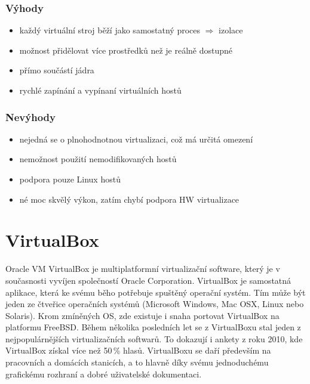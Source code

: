 \subsubsection{Výhody}
\begin{itemize}
  \item každý virtuální stroj běží jako samostatný proces $\Rightarrow$ izolace
  \item možnost přidělovat více prostředků než je reálně dostupné
  \item přímo součástí jádra
  \item rychlé zapínání a vypínaní virtuálních hostů
\end{itemize}

\subsubsection{Nevýhody}
\begin{itemize}
  \item nejedná se o plnohodnotnou virtualizaci, což má určitá omezení
  \item nemožnost použití nemodifikovaných hostů
  \item podpora pouze Linux hostů
  \item né moc skvělý výkon, zatím chybí podpora HW virtualizace
\end{itemize}

\section{VirtualBox}
Oracle VM VirtualBox je multiplatformní virtualizační software, který je v současnosti vyvíjen společností Oracle Corporation. VirtualBox je samostatná aplikace, která ke svému běho potřebuje spuštěný operační systém. Tím může být jeden ze čtveřice operačních systémů (Microsoft Windows, Mac OSX, Linux nebo Solaris). Krom zmíněných OS, zde existuje i snaha portovat VirtualBox na platformu FreeBSD. Během několika posledních let se z VirtualBoxu stal jeden z nejpopulárnějších virtualizačních softwarů. To dokazují i ankety z roku 2010, kde VirtualBox získal více než 50\,\% hlasů. VirtualBoxu se daří především na pracovních a domácích stanicích, a to hlavně díky svému jednoduchému grafickému rozhraní a dobré uživatelské dokumentaci.


